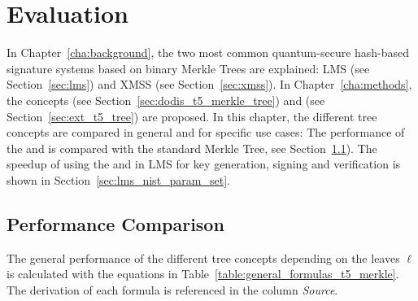 \chapter{Evaluation}
\label{cha:evaluation}
In Chapter~\ref{cha:background}, the two most common quantum-secure hash-based signature systems based on binary Merkle Trees are explained: LMS (see Section~\ref{sec:lms}) and XMSS (see Section~\ref{sec:xmss}). In Chapter~\ref{cha:methods}, the concepts \tftree (see Section~\ref{sec:dodis_t5_merkle_tree}) and \extree (see Section~\ref{sec:ext_t5_tree}) are proposed. In this chapter, the different tree concepts are compared in general and for specific use cases: The performance of the \tftree and \extree is compared with the standard Merkle Tree, see Section~\ref{sec:performance_comparison}). 
The speedup of using the \tftree and \extree in LMS for key generation, signing and verification is shown in Section~\ref{sec:lms_nist_param_set}. 

\section{Performance Comparison}
\label{sec:performance_comparison}
The general performance of the different tree concepts depending on the leaves $\ell$ is calculated with the equations in Table~\ref{table:general_formulas_t5_merkle}. The derivation of each formula is referenced in the column \textit{Source}.

